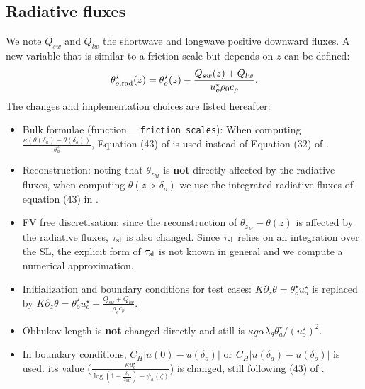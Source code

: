 \subsection{Radiative fluxes}
We note $Q_{sw}$ and $Q_{lw}$ the shortwave and longwave positive
downward fluxes. A new variable that is similar to a friction
scale but depends on $z$ can be defined:
\begin{equation}
\theta^\star_{o, \rm rad}(z) =
	\theta^\star_{o}(z) -
	\frac{Q_{sw}(z) + Q_{lw}}{u^{\star}_o\rho_0 c_p}.
\end{equation}
The changes and implementation choices are listed hereafter:
\begin{itemize}
	\item Bulk formulae (function \verb|__friction_scales|):
		When computing
		$\frac{\kappa (\theta(\delta_a) - \theta(\delta_o))}
		{\theta_a^{\star}}$,
		Equation (43) of \citep{pelletier2021two} is
		used instead of Equation (32) of
		\citep{pelletier2021two}.
	\item Reconstruction: noting that $\theta_{z_M}$ is
		\textbf{not} directly affected by the
		radiative fluxes, when computing $\theta(z>\delta_o)$
		we use the integrated radiative fluxes of
		equation (43) in \citep{pelletier2021two}.
	\item FV free discretisation: since the reconstruction
		of $\theta_{z_M} - \theta(z)$ is affected by
		the radiative fluxes, $\tau_{\rm sl}$ is also
		changed. Since $\tau_{\rm sl}$ relies on an
		integration over the SL, the explicit form
		of $\tau_{\rm sl}$ is not known in general
		and we compute a numerical approximation.
	\item Initialization and boundary conditions for test cases:
		$K\partial_z \theta = \theta^{\star}_o u^{\star}_o$
		is replaced by
		$K\partial_z \theta = \theta^{\star}_o u^{\star}_o
		- \frac{Q_{sw} + Q_{lw}}{\rho_o c_p}$.
	\item Obhukov length is \textbf{not} changed directly and
		still is $\kappa g \alpha \lambda_\theta
		\theta^\star_a / (u^\star_o)^2$.
	\item In boundary conditions, $C_H |u(0)-u(\delta_o)|$ or
		$C_H |u(\delta_a)-u(\delta_o)|$ is used.
		its value ($\frac{\kappa u^{\star}_o}
		{\log(1-\frac{\delta_o}{z_{0H}}) - \psi_h(\zeta)}$)
		is changed, still following (43) of
		\citep{pelletier2021two}.
\end{itemize}
